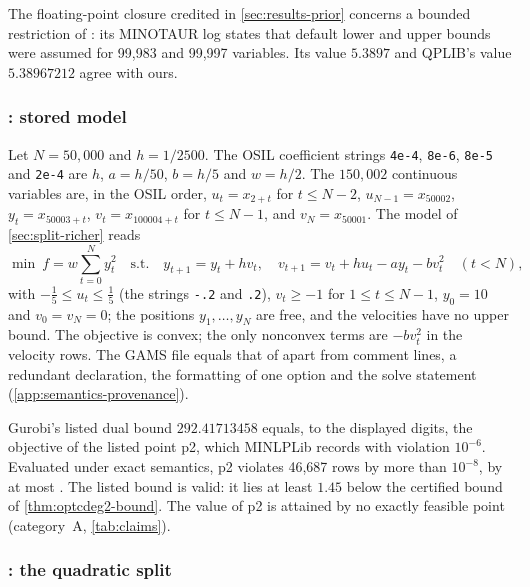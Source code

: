 The floating-point closure credited in \cref{sec:results-prior} concerns a bounded restriction of : its MINOTAUR log states that default lower and upper bounds were assumed for 99,983 and 99,997 variables.
Its value $5.3897$ and QPLIB's value $5.38967212$ \citep{furini2026-qplib-official-solution-point-records} agree with ours.

\subsubsection{: stored model}\label{app:optcdeg2-model}

Let $N=50{,}000$ and $h=1/2500$.
The OSIL coefficient strings \texttt{4e-4}, \texttt{8e-6}, \texttt{8e-5} and \texttt{2e-4} are $h$, $a=h/50$, $b=h/5$ and $w=h/2$.
The $150{,}002$ continuous variables are, in the OSIL order, $u_t=x_{2+t}$ for $t\le N-2$, $u_{N-1}=x_{50002}$, $y_t=x_{50003+t}$, $v_t=x_{100004+t}$ for $t\le N-1$, and $v_N=x_{50001}$.
The model of \cref{sec:split-richer} reads
\begin{equation}\label{eq:optcdeg2-model}
\min\ f=w\sum_{t=0}^{N}y_t^2
\quad\text{s.t.}\quad
y_{t+1}=y_t+hv_t,\quad v_{t+1}=v_t+hu_t-ay_t-bv_t^2\quad(t<N),
\end{equation}
with $-\tfrac15\le u_t\le\tfrac15$ (the strings \texttt{-.2} and \texttt{.2}), $v_t\ge-1$ for $1\le t\le N-1$, $y_0=10$ and $v_0=v_N=0$; the positions $y_1,\dots,y_N$ are free, and the velocities have no upper bound.
The objective is convex; the only nonconvex terms are $-bv_t^2$ in the velocity rows.
The GAMS file equals that of  apart from comment lines, a redundant declaration, the formatting of one option and the solve statement (\cref{app:semantics-provenance}).

Gurobi's listed dual bound $292.41713458$ equals, to the displayed digits, the objective of the listed point p2, which MINLPLib records with violation $10^{-6}$.
Evaluated under exact semantics, p2 violates 46,687 rows by more than $10^{-8}$, by at most .
The listed bound is valid: it lies at least $1.45$ below the certified bound of \cref{thm:optcdeg2-bound}.
The value of p2 is attained by no exactly feasible point (category~A, \cref{tab:claims}).

\subsubsection{: the quadratic split}\label{app:optcdeg2-proof}

